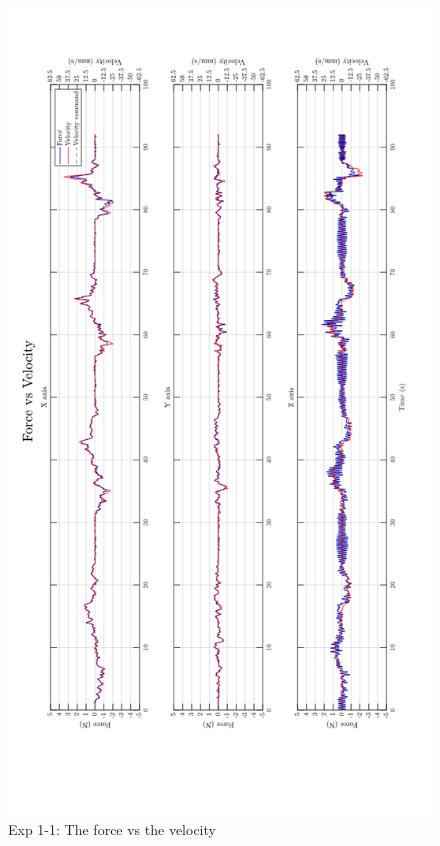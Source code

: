 \begin{figure}[htbp]
\begin{center}
\includegraphics[width=1\linewidth]{Images/exp/exp1_1_2.png}
\caption{Exp 1-1: The force vs the velocity}
\label{fig: exp1_1_2}
\end{center}
\end{figure}	

